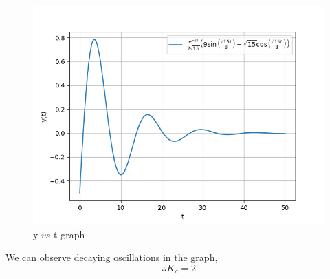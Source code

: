 \documentclass[journal,12pt,twocolumn]{IEEEtran}
\theoremstyle{remark}
\begin{document}
\begin{figure}[htbp]
    \centering
    \includegraphics[width=\columnwidth]{figs/b.png}
    \caption{y $vs$ t graph}
    \label{fig:ch.45.2}
\end{figure}    
We can observe decaying oscillations in the graph,    
$$\therefore K_c=2$$
\end{document}
